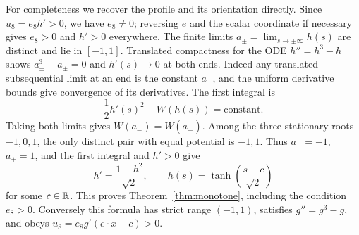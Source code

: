 For completeness we recover the profile and its orientation directly.
Since $u_8=e_8h'>0$, we have $e_8\ne0$; reversing $e$ and the
scalar coordinate if necessary gives $e_8>0$ and $h'>0$ everywhere.
The finite limits $a_\pm=\lim_{s\to\pm\infty}h(s)$ are distinct
and lie in $[-1,1]$.  Translated compactness for the ODE
$h''=h^3-h$ shows $a_\pm^3-a_\pm=0$ and $h'(s)\to0$ at both
ends.  Indeed any translated subsequential limit at an end is the
constant $a_\pm$, and the uniform derivative bounds give convergence
of its derivatives.  The first integral is
\[
 \frac12h'(s)^2-W(h(s))=\text{constant}.
\]
Taking both limits gives $W(a_-)=W(a_+)$.  Among the three stationary
roots $-1,0,1$, the only distinct pair with equal potential is
$-1,1$.  Thus $a_-=-1$, $a_+=1$, and the first integral and $h'>0$
give
\[
 h'=\frac{1-h^2}{\sqrt2},\qquad
 h(s)=\tanh\left(\frac{s-c}{\sqrt2}\right)
\]
for some $c\in\mathbb R$.  This proves Theorem~\ref{thm:monotone}, including
the condition $e_8>0$.  Conversely this formula has strict range
$(-1,1)$, satisfies $g''=g^3-g$, and obeys
$u_8=e_8g'(e\cdot x-c)>0$.


